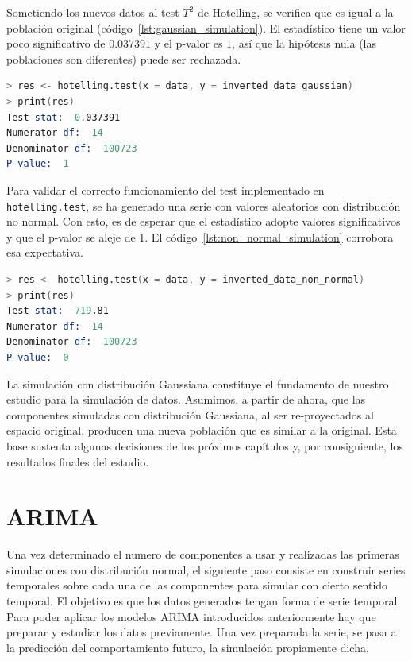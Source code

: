 \documentclass[11pt,spanish,listoffigures,listoftables]{tfgetsinf}
\begin{document}
    Sometiendo los nuevos datos al test \(T^2\) de Hotelling, se verifica que es igual a la población original (código~\ref{lst:gaussian_simulation}). El estadístico tiene un valor poco significativo de \(0.037391\) y el p-valor es \(1\), así que la hipótesis nula (las poblaciones son diferentes) puede ser rechazada.
    
    \begin{lstlisting}[language=S, caption=Test \(T^2\) de Hotelling para la simulación con distribución Gaussiana., label={lst:gaussian_simulation}]
> res <- hotelling.test(x = data, y = inverted_data_gaussian)
> print(res)
Test stat:  0.037391 
Numerator df:  14 
Denominator df:  100723 
P-value:  1 
    \end{lstlisting}
    
    Para validar el correcto funcionamiento del test implementado en {\tt hotelling.test}, se ha generado una serie con valores aleatorios con distribución no normal. Con esto, es de esperar que el estadístico adopte valores significativos y que el p-valor se aleje de \(1\). El código~\ref{lst:non_normal_simulation} corrobora esa expectativa.
   
    \begin{lstlisting}[language=S, caption=Test \(T^2\) de Hotelling para la simulación con distribución no normal., label={lst:non_normal_simulation}]
> res <- hotelling.test(x = data, y = inverted_data_non_normal)
> print(res)
Test stat:  719.81 
Numerator df:  14 
Denominator df:  100723 
P-value:  0 
    \end{lstlisting}

    La simulación con distribución Gaussiana constituye el fundamento de nuestro estudio para la simulación de datos. Asumimos, a partir de ahora, que las componentes simuladas con distribución Gaussiana, al ser re-proyectados al espacio original, producen una nueva población que es similar a la original. Esta base sustenta algunas decisiones de los próximos capítulos y, por consiguiente, los resultados finales del estudio.
    
    
    \section{ARIMA}
    Una vez determinado el numero de componentes a usar y realizadas las primeras simulaciones con distribución normal, el siguiente paso consiste en construir series temporales sobre cada una de las componentes para simular con cierto sentido temporal. El objetivo es que los datos generados tengan forma de serie temporal. Para poder aplicar los modelos ARIMA introducidos anteriormente hay que preparar y estudiar los datos previamente. Una vez preparada la serie, se pasa a la predicción del comportamiento futuro, la simulación propiamente dicha.
        
\end{document}

